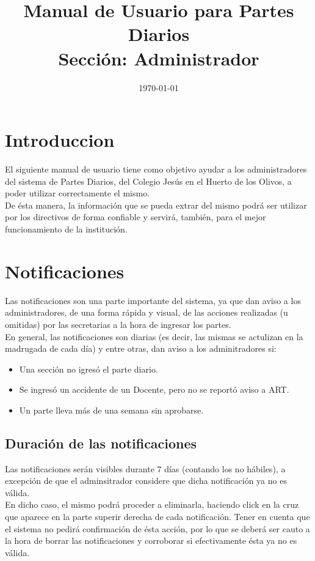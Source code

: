 \documentclass[12pt,a4paper]{article}
\title{Manual de Usuario para Partes Diarios \\ Sección: Administrador}
\begin{document}
\date{\today}
\maketitle

\section{Introduccion}

El siguiente manual de usuario tiene como objetivo ayudar a los administradores del sistema de Partes Diarios, del Colegio Jesús en el Huerto de los Olivos, a poder utilizar correctamente el mismo. \\
De ésta manera, la información que se pueda extrar del mismo podrá ser utilizar por los directivos de forma confiable y servirá, también, para el mejor funcionamiento de la institución.

\section{Notificaciones}

Las notificaciones son una parte importante del sistema, ya que dan aviso a los administradores, de una forma rápida y visual, de las acciones realizadas (u omitidas) por las secretarias a la hora de ingresar los partes. \\
En general, las notificaciones son diarias (es decir, las mismas se actulizan en la madrugada de cada día) y entre otras, dan aviso a los adminitradores si:
\begin{itemize}
	\item Una sección no igresó el parte diario.
	\item Se ingresó un accidente de un Docente, pero no se reportó aviso a ART.
	\item Un parte lleva más de una semana sin aprobarse.
\end{itemize}

\subsection{Duración de las notificaciones}
Las notificaciones serán visibles durante 7 días (contando los no hábiles), a excepción de que el adminsitrador considere que dicha notificación ya no es válida. \\
En dicho caso, el mismo podrá proceder a eliminarla, haciendo click en  la cruz que aparece en la parte superir derecha de cada notificación. Tener en cuenta que el sistema no pedirá confirmación de ésta acción, por lo que se deberá ser cauto a la hora de borrar las notificaciones y corroborar si efectivamente ésta ya no es válida.
\end{document}
